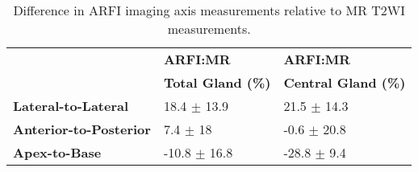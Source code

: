 \begin{table}[h!]
\centering
\caption{Difference in ARFI imaging axis measurements relative to MR T2WI measurements.}
\begin{tabular}{|l|l|l|} \hline
 & {\bf ARFI:MR} & {\bf ARFI:MR} \\ 
 & {\bf Total Gland (\%)} & {\bf Central Gland (\%)} \\ \hline 
{\bf Lateral-to-Lateral} & 18.4 $\pm$ 13.9 & 21.5 $\pm$ 14.3 \\ 
{\bf Anterior-to-Posterior} & 7.4 $\pm$ 18 & -0.6 $\pm$ 20.8 \\ 
{\bf Apex-to-Base} & -10.8 $\pm$ 16.8 & -28.8 $\pm$ 9.4 \\ 
\hline
\end{tabular}
\label{tab:mr_arfi_axes_error}
\end{table}
